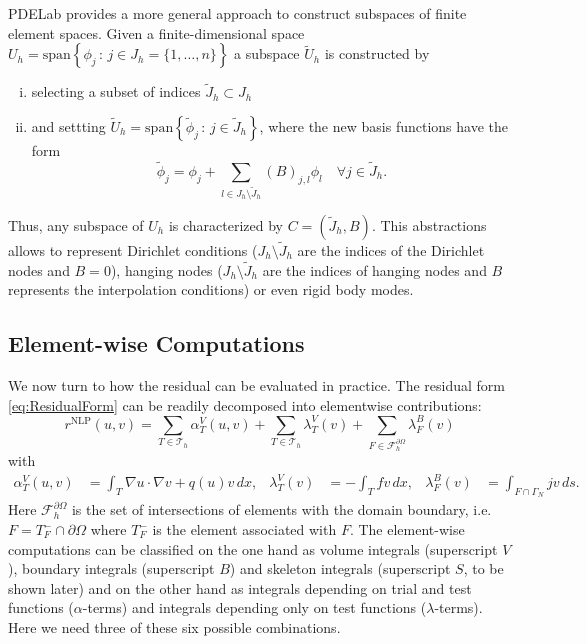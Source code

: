 \documentclass[a4paper,12pt]{article}
\begin{document}
PDELab provides a more general approach to construct subspaces of
finite element spaces. Given a
finite-dimensional space $U_h = \text{span}\left\{\phi_j \,:\, j\in J_h=\{1,\ldots,n\}\right\}$
a subspace $\tilde{U}_h$ is constructed by
\begin{enumerate}[i)]
\item selecting a subset of indices $\tilde{J}_h\subset J_h$
\item and settting $\tilde{U}_h = \text{span}\left\{\tilde\phi_j \,:\, j\in \tilde{J}_h\right\}$,
where the new basis functions have the form
\begin{equation*}
\tilde\phi_j = \phi_j + \sum_{l\in J_h\setminus\tilde{J}_h} (B)_{j,l} \phi_l \quad \forall j\in \tilde{J}_h.
\end{equation*}
\end{enumerate}
Thus, any subspace of $U_h$ is characterized by $C=(\tilde{J}_h,B)$.
This abstractions allows to represent Dirichlet conditions ($J_h\setminus\tilde{J}_h$
are the indices of the Dirichlet nodes and $B=0$), hanging nodes
($J_h\setminus\tilde{J}_h$ are the indices of hanging nodes and $B$ represents
the interpolation conditions) or even rigid body modes.


\subsection{Element-wise Computations}
\label{Sec:ElementComputations}

We now turn to how the residual can be evaluated in practice.
The residual form \eqref{eq:ResidualForm} can be readily decomposed into
elementwise contributions:
\begin{equation*}
r^{\text{NLP}}\left(u,v\right) =
\sum_{T\in\mathcal{T}_h} \alpha_T^V(u,v)
  + \sum_{T\in\mathcal{T}_h} \lambda_T^V(v)
 + \sum_{F\in\mathcal{F}_h^{\partial\Omega}}\lambda_F^B(v)
\end{equation*}
with
\begin{align*}
\alpha_T^V(u,v) &= \int_T \nabla u \cdot \nabla v + q(u) v \,dx, &
\lambda_T^V(v) &= - \int_T f v \,dx, &
\lambda_F^B(v) &= \int_{F\cap\Gamma_N} j v\,ds.
\end{align*}
Here $\mathcal{F}_h^{\partial\Omega}$ is the set of intersections of
elements with the domain boundary, i.e. $F=T_F^-\cap\partial\Omega$
where $T_F^-$ is the element associated with $F$.
The element-wise computations can be classified on the one hand as volume
integrals (superscript $V$), boundary integrals (superscript $B$) and
skeleton integrals (superscript $S$, to be shown later) and on the
other hand as integrals depending on trial and test functions ($\alpha$-terms)
and integrals depending only on test functions ($\lambda$-terms). Here we need
three of these six possible combinations.
\end{document}
